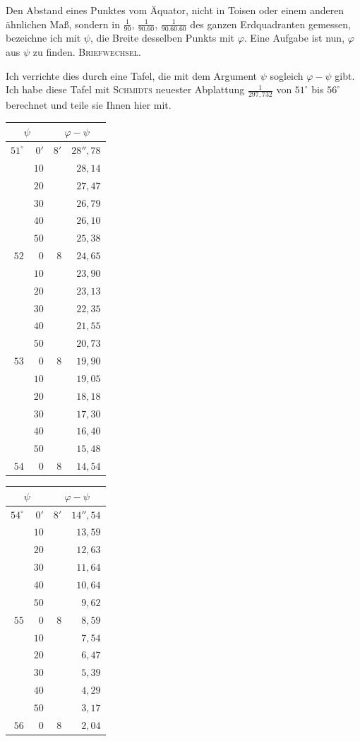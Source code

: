 Den Abstand eines Punktes vom Äquator, nicht in Toisen oder einem anderen ähnlichen Maß, sondern in $\frac1{90}$, $\frac1{90.60}$, $\frac1{90.60.60}$ des ganzen Erdquadranten gemessen, bezeichne ich mit $\psi$, die Breite desselben Punkts mit $\varphi$. Eine Aufgabe ist nun, $\varphi$ aus $\psi$ zu finden.
\clearpage
{}\hfill\textsc{Briefwechsel.}\hfill\mbox{}\par\medskip
Ich verrichte dies durch eine Tafel, die mit dem Argument $\psi$ sogleich $\varphi-\psi$ gibt. Ich habe diese Tafel mit \textsc{Schmidts} neuester Abplattung $\frac1{297{,}732}$ von $51^\circ$ bis $56^\circ$ berechnet und teile sie Ihnen hier mit.
\begin{center}
\renewcommand{\arraystretch}{1.07}
\begin{tabular}[t]{|r@{\;}r|r@{\;}r|}
\hline
\multicolumn{2}{|c|}{$\psi$}&\multicolumn{2}{c|}{$\varphi-\psi$}\\\hline\hline
$51^\circ$&$0'$&$8'$&$28''{,}78$\\\hline
&$10$&&$28{,}14$\\
&$20$&&$27{,}47$\\
&$30$&&$26{,}79$\\
&$40$&&$26{,}10$\\
&$50$&&$25{,}38$\\
$52$&$0$&$8$&$24{,}65$\\\hline
&$10$&&$23{,}90$\\
&$20$&&$23{,}13$\\
&$30$&&$22{,}35$\\
&$40$&&$21{,}55$\\
&$50$&&$20{,}73$\\
$53$&$0$&$8$&$19{,}90$\\\hline
&$10$&&$19{,}05$\\
&$20$&&$18{,}18$\\
&$30$&&$17{,}30$\\
&$40$&&$16{,}40$\\
&$50$&&$15{,}48$\\
$54$&$0$&$8$&$14{,}54$
\end{tabular}
\hspace{2cm}
\begin{tabular}[t]{|r@{\;}r|r@{\;}r|}
\hline
\multicolumn{2}{|c|}{$\psi$}&\multicolumn{2}{c|}{$\varphi-\psi$}\\\hline\hline
$54^\circ$&$0'$&$8'$&$14''{,}54$\\\hline
&$10$&&$13{,}59$\\
&$20$&&$12{,}63$\\
&$30$&&$11{,}64$\\
&$40$&&$10{,}64$\\
&$50$&&$9{,}62$\\
$55$&$0$&$8$&$8{,}59$\\\hline
&$10$&&$7{,}54$\\
&$20$&&$6{,}47$\\
&$30$&&$5{,}39$\\
&$40$&&$4{,}29$\\
&$50$&&$3{,}17$\\
$56$&$0$&$8$&$2{,}04$
\end{tabular}
\end{center}
